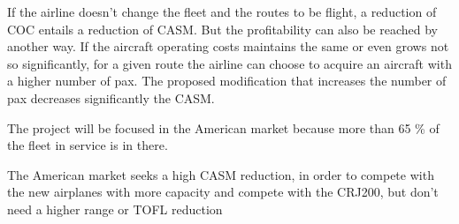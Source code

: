 If the airline doesn't change the fleet and the routes to be flight, a reduction of COC entails a reduction of CASM. But the profitability can also be reached by another way. If the aircraft operating costs maintains the same or even grows not so significantly, for a given route the airline can choose to acquire an aircraft with a higher number of pax.
The proposed modification that increases the number of pax decreases significantly the CASM. 

The project will be focused in the American market because more than 65 \% of the fleet in service is in there.

The American market seeks a high CASM reduction, in order to compete with the new airplanes with more capacity and compete with the CRJ200, but don't need a higher range or TOFL reduction
